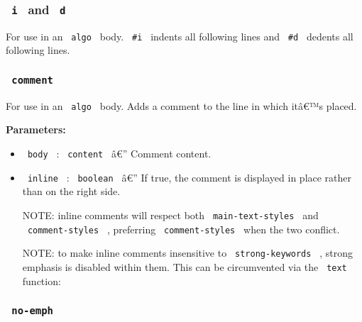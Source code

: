 \subsubsection{\texorpdfstring{\texttt{\ i\ } and
\texttt{\ d\ }}{ i  and  d }}\label{i-and-d}

For use in an \texttt{\ algo\ } body. \texttt{\ \#i\ } indents all
following lines and \texttt{\ \#d\ } dedents all following lines.

\subsubsection{\texorpdfstring{\texttt{\ comment\ }}{ comment }}\label{comment}

For use in an \texttt{\ algo\ } body. Adds a comment to the line in
which itâ€™s placed.

\begin{Shaded}
\begin{Highlighting}[]
\NormalTok{)}
\end{Highlighting}
\end{Shaded}

\textbf{Parameters:}

\begin{itemize}
\item
  \texttt{\ body\ } : \texttt{\ content\ } â€'' Comment content.
\item
  \texttt{\ inline\ } : \texttt{\ boolean\ } â€'' If true, the comment
  is displayed in place rather than on the right side.

  NOTE: inline comments will respect both \texttt{\ main-text-styles\ }
  and \texttt{\ comment-styles\ } , preferring
  \texttt{\ comment-styles\ } when the two conflict.

  NOTE: to make inline comments insensitive to
  \texttt{\ strong-keywords\ } , strong emphasis is disabled within
  them. This can be circumvented via the \texttt{\ text\ } function:

\begin{Shaded}
\begin{Highlighting}[]
\end{Highlighting}
\end{Shaded}
\end{itemize}

\subsubsection{\texorpdfstring{\texttt{\ no-emph\ }}{ no-emph }}\label{no-emph}


